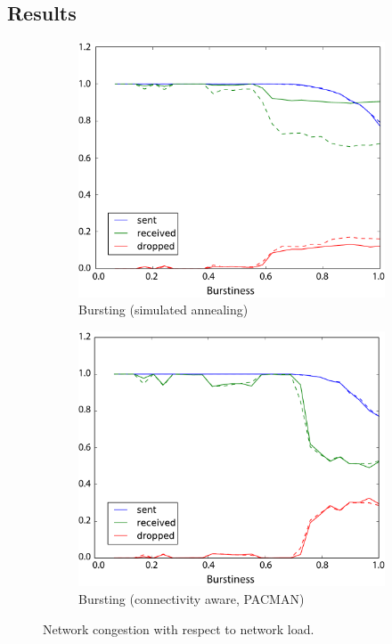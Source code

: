 \documentclass[a4paper, 11pt]{article}
\begin{document}
\subsection{Results}

\begin{figure}[b]
	\begin{subfigure}{.5\linewidth}
		\centering
		\includegraphics[width=0.9\linewidth]{images/bursting2.pdf}
		\caption{Bursting (simulated annealing)}
		\label{fig:bursting}
	\end{subfigure}
	\begin{subfigure}{.5\linewidth}
		\centering
		\includegraphics[width=0.9\linewidth]{images/bursting_connaware2.pdf}
		\caption{Bursting (connectivity aware, PACMAN)}	
		\label{fig:bursting_aware}
	\end{subfigure}
	\caption{Network congestion with respect to network load.}
	\label{fig:congestion}
\end{figure}
\end{document}
